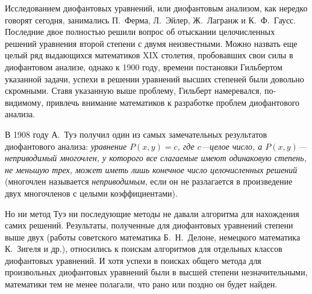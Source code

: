 \documentclass[twocolumn,10pt]{article}
\begin{document}
Исследованием диофантовых уравнений, или диофантовым анализом, как нередко говорят сегодня, занимались П.~Ферма, Л.~Эйлер, Ж.~Лагранж и К.~Ф.~Гаусс. Последние двое полностью решили вопрос об отыскании целочисленных решений уравнения второй степени с двумя неизвестными. Можно назвать еще целый ряд выдающихся математиков XIX столетия, пробовавших свои силы в диофантовом анализе, однако к 1900 году, времени постановки Гильбертом указанной задачи, успехи в решении уравнений высших степеней были довольно скромными. Ставя указанную выше проблему, Гильберт намеревался, по-видимому, привлечь внимание математиков к разработке проблем диофантового анализа.

В 1908 году А.~Туэ получил один из самых замечательных результатов диофантового анализа: \emph{уравнение $P(x, y)=c$, где $c$---целое число, а $P(x,y)$---неприводимый многочлен, у которого все слагаемые имеют одинаковую степень, не меньшую трех, может иметь лишь конечное число целочисленных решений} (многочлен называется \emph{неприводимым}, если он не разлагается в произведение двух многочленов с целыми коэффициентами).

Но ни метод Туэ ни последующие методы не давали алгоритма для нахождения самих решений. Результаты, полученные для диофантовых уравнений степени выше двух (работы советского математика Б.~Н.~Делоне, немецкого математика К.~Зигеля и др.), относились к поискам алгоритмов для отдельных классов диофантовых уравнений. И хотя успехи в поисках общего метода для произвольных диофантовых уравнений были в высшей степени незначительными, математики тем не менее полагали, что рано или поздно он будет найден.
\end{document}
